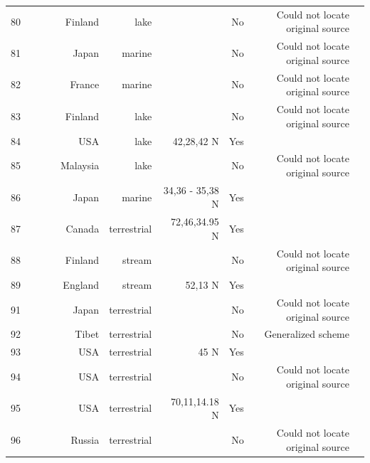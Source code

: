 \documentclass[12pt]{article}
\begin{document}
\begin{landscape}
\begin{table}[h!]
\begin{tabular}{rrrrrrrrr}
      80    & ~\citet{GlobalWeb} & ~\citet{Sarvala1974} & Finland & lake &       & No    & Could not locate original source &  \\
      81    & ~\citet{GlobalWeb} & ~\citet{Hatanaka1977} & Japan & marine &       & No    & Could not locate original source &  \\
      82    & ~\citet{GlobalWeb} & ~\citet{Cohen1990} & France & marine &       & No    & Could not locate original source &  \\
      83    & ~\citet{GlobalWeb} & ~\citet{Cohen1990} & Finland & lake &       & No    & Could not locate original source &  \\
      84    & ~\citet{GlobalWeb} & ~\citet{Wilbur1972} & USA   & lake & 42,28,42 N & Yes   &       &  \\
      85    & ~\citet{GlobalWeb} & ~\citet{Mizuno1982} & Malaysia & lake &       & No    & Could not locate original source &  \\
      86    & ~\citet{GlobalWeb} & ~\citet{Hogetsu1979} & Japan & marine & 34,36 - 35,38 N & Yes   &       &  \\
      87    & ~\citet{GlobalWeb} & ~\citet{Bradstreet1982} & Canada & terrestrial & 72,46,34.95 N & Yes   &       &  \\
      88    & ~\citet{GlobalWeb} & ~\citet{Kuusela1980} & Finland & stream &       & No    & Could not locate original source &  \\
      89    & ~\citet{GlobalWeb} & ~\citet{Hartley1948} & England & stream & 52,13 N & Yes   &       &  \\
      91    & ~\citet{GlobalWeb} & ~\citet{Cohen1990} & Japan & terrestrial &       & No    & Could not locate original source &  \\
      92    & ~\citet{GlobalWeb} & ~\citet{Swan1961} & Tibet & terrestrial &       & No    & Generalized scheme &  \\
      93    & ~\citet{GlobalWeb} & ~\citet{Pattie1966} & USA   & terrestrial & 45 N  & Yes   &       &  \\
      94    & ~\citet{GlobalWeb} & ~\citet{Brown1971} & USA   & terrestrial &       & No    & Could not locate original source &  \\
      95    & ~\citet{GlobalWeb} & ~\citet{Brown1975} & USA   & terrestrial & 70,11,14.18 N & Yes   &       &  \\
      96    & ~\citet{GlobalWeb} & ~\citet{Cohen1990} & Russia & terrestrial &       & No    & Could not locate original source &  \\

\end{tabular}
\end{table}
\end{landscape}
\end{document}
